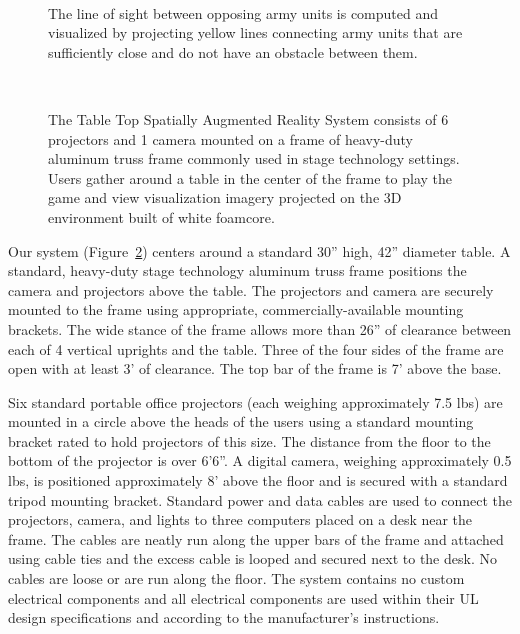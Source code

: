 \documentclass[10pt]{article}
\begin{document}
\begin{figure}[t]
\centering
{}
 \\
\caption{ The line of sight between opposing army units is computed
  and visualized by projecting yellow lines connecting army units that
  are sufficiently close and do not have an obstacle between them. }
\label{FIGURE_combat}
\end{figure}







\begin{figure}[t]
\centering
{}
 \\
\caption{ The Table Top Spatially Augmented Reality System consists
  of 6 projectors and 1 camera mounted on a frame of heavy-duty
  aluminum truss frame commonly used in stage technology settings.
  Users gather around a table in the center of the frame to play the
  game and view visualization imagery projected on the 3D environment
  built of white foamcore.}
\label{FIGURE_contraption}
\end{figure}



Our system (Figure~\ref{FIGURE_contraption}) centers around a standard
30'' high, 42'' diameter table.  A standard, heavy-duty stage
technology aluminum truss frame positions the camera and projectors
above the table.  The projectors and camera are securely mounted to
the frame using appropriate, commercially-available mounting brackets.
The wide stance of the frame allows more than 26'' of clearance
between each of 4 vertical uprights and the table.  Three of the four
sides of the frame are open with at least 3' of clearance.  The top
bar of the frame is 7' above the base.  

Six standard portable office projectors (each weighing approximately
7.5 lbs) are mounted in a circle above the heads of the users using a
standard mounting bracket rated to hold projectors of this size.  The distance
from the floor to the bottom of the projector is over 6'6''.  A
digital camera, weighing approximately 0.5 lbs, is positioned
approximately 8' above the floor and is secured with a standard tripod
mounting bracket.  Standard power and data cables are used to connect
the projectors, camera, and lights to three computers placed on a desk
near the frame.  The cables are neatly run along the upper bars of the
frame and attached using cable ties and the excess cable is looped and
secured next to the desk.  No cables are loose or are run along the
floor.  The system contains no custom electrical components and all
electrical components are used within their UL design specifications
and according to the manufacturer's instructions.
\end{document}
